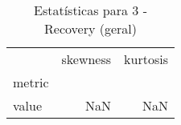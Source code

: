 \begin{table}[htbp]
\caption{Estatísticas para 3 - Recovery (geral)}
\label{tab:3_-_recovery_(geral)_skewkurt}
\begin{tabular}{lrr}
\toprule
 & skewness & kurtosis \\
metric &  &  \\
\midrule
value & NaN & NaN \\
\bottomrule
\end{tabular}
\end{table}
